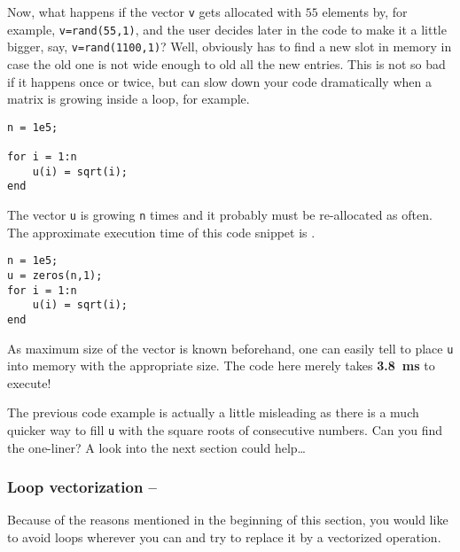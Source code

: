 
Now, what happens if the vector \lstinline!v! gets allocated with $55$
elements by, for example, \lstinline!v=rand(55,1)!, and the user decides later
in the code to make it a little bigger, say, \lstinline!v=rand(1100,1)!? Well,
obviously \matlab{} has to find a new slot in memory in case the old one is
not wide enough to old all the new entries. This is not so bad if it happens
once or twice, but can slow down your code dramatically when a matrix is
growing inside a loop, for example.


\hfill
\begin{minipage}[t]{.45\textwidth}
\begin{lstlisting}[framerule=2pt,rulecolor=\color{badred}]
n = 1e5;

for i = 1:n
    u(i) = sqrt(i);
end
\end{lstlisting}
The vector \lstinline!u! is growing \lstinline!n! times and it probably must be
re-allocated as often. The approximate execution time of this code snippet is
.
\end{minipage}
\hfill
\begin{minipage}[t]{.45\textwidth}
\begin{lstlisting}[framerule=2pt,rulecolor=\color{goodgreen}]
n = 1e5;
u = zeros(n,1);
for i = 1:n
    u(i) = sqrt(i);
end
\end{lstlisting}
As maximum size of the vector is known beforehand, one can easily tell
\matlab{} to place \lstinline!u! into memory with the appropriate size. The
code here merely takes \textbf{\SI{3.8}{\milli\second}} to execute!
\end{minipage}
\hfill

\begin{remark}
The previous code example is actually a little misleading as there is a much
quicker way to fill \lstinline!u! with the square roots of consecutive numbers.
Can you find the one-liner? A look into the next section could help\dots
\end{remark}


\subsubsection{Loop vectorization -- \fastsymbol\fastsymbol\fastsymbol\fastsymbol\fastsymbol}

Because of the reasons mentioned in the beginning of this section, you would
like to avoid loops wherever you can and try to replace it by a vectorized
operation.

